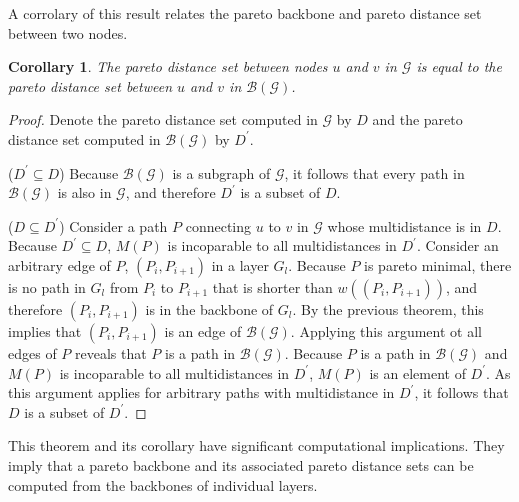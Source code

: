 \documentclass{article}
\newtheorem{corollary}{Corollary}[theorem]
\begin{document}
A corrolary of this result relates the pareto backbone and pareto distance set between two nodes.

\begin{corollary}
    The pareto distance set between nodes $u$ and $v$ in $\mathcal{G}$ is equal to the pareto distance
    set between $u$ and $v$ in $\mathcal{B}(\mathcal{G})$.
\end{corollary}
\begin{proof}
    Denote the pareto distance set computed in $\mathcal{G}$ by $D$ and the pareto distance set computed
    in $\mathcal{B}(\mathcal{G})$ by $D^\prime$. 
    
    ($D^\prime\subseteq D$) Because $\mathcal{B}(\mathcal{G})$ is a subgraph of
    $\mathcal{G}$, it follows that every path in $\mathcal{B}(\mathcal{G})$ is also in $\mathcal{G}$, and
    therefore $D^\prime$ is a subset of $D$.

    ($D\subseteq D^\prime$) Consider a path $P$ connecting $u$ to $v$ in $\mathcal{G}$ whose
    multidistance is in $D$. Because $D^\prime\subseteq D$, $M(P)$ is incoparable to
    all multidistances in $D^\prime$. Consider an arbitrary edge of $P$, $(P_i,P_{i+1})$
    in a layer $G_l$. Because $P$ is pareto minimal, there is no path in $G_l$ from $P_i$ to
    $P_{i+1}$ that is shorter than $w((P_i,P_{i+1}))$, and therefore $(P_i,P_{i+1})$ is in the backbone
    of $G_l$. By the previous theorem, this implies that $(P_i,P_{i+1})$ is an edge of 
    $\mathcal{B}(\mathcal{G})$. Applying this argument ot all edges of $P$ reveals that $P$ is a path in
    $\mathcal{B}(\mathcal{G})$. Because $P$ is a path in $\mathcal{B}(\mathcal{G})$ and $M(P)$ is 
    incoparable to
    all multidistances in $D^\prime$, $M(P)$ is an element of $D^\prime$. As this argument applies for 
    arbitrary paths with multidistance in $D^\prime$, it follows that $D$ is a subset of
    $D^\prime$.
\end{proof}

This theorem and its corollary have significant computational implications. They imply that a pareto
backbone and its associated pareto distance sets can be computed from the backbones of individual layers.
\end{document}
